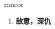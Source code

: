 
\begin{frame}
{\huge rancor}
\begin{center}
\begin{enumerate}\Large
  \item \textbf{敌意，深仇}
\end{enumerate}
\end{center}
\end{frame}
